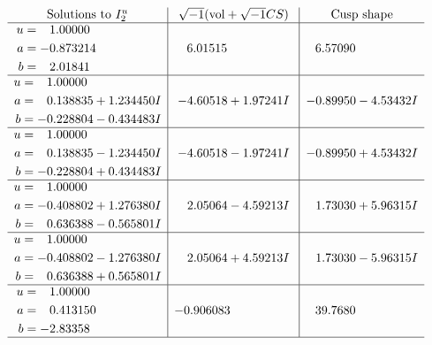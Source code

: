 \documentclass[1p]{elsarticle_modified}
\theoremstyle{definition}
\newcommand{\I}{\sqrt{-1}}
\begin{document}
$$\begin{array}{c|c|c}  
\text{Solutions to }I^u_{2}& \I (\text{vol} + \sqrt{-1}CS) & \text{Cusp shape}\\
 \hline 
\begin{aligned}
u &= \phantom{-}1.00000\phantom{ +0.000000I} \\
a &= -0.873214\phantom{ +0.000000I} \\
b &= \phantom{-}2.01841\phantom{ +0.000000I}\end{aligned}
 & \phantom{-}6.01515\phantom{ +0.000000I} & \phantom{-}6.57090\phantom{ +0.000000I} \\ \hline\begin{aligned}
u &= \phantom{-}1.00000\phantom{ +0.000000I} \\
a &= \phantom{-}0.138835 + 1.234450 I \\
b &= -0.228804 - 0.434483 I\end{aligned}
 & -4.60518 + 1.97241 I & -0.89950 - 4.53432 I \\ \hline\begin{aligned}
u &= \phantom{-}1.00000\phantom{ +0.000000I} \\
a &= \phantom{-}0.138835 - 1.234450 I \\
b &= -0.228804 + 0.434483 I\end{aligned}
 & -4.60518 - 1.97241 I & -0.89950 + 4.53432 I \\ \hline\begin{aligned}
u &= \phantom{-}1.00000\phantom{ +0.000000I} \\
a &= -0.408802 + 1.276380 I \\
b &= \phantom{-}0.636388 - 0.565801 I\end{aligned}
 & \phantom{-}2.05064 - 4.59213 I & \phantom{-}1.73030 + 5.96315 I \\ \hline\begin{aligned}
u &= \phantom{-}1.00000\phantom{ +0.000000I} \\
a &= -0.408802 - 1.276380 I \\
b &= \phantom{-}0.636388 + 0.565801 I\end{aligned}
 & \phantom{-}2.05064 + 4.59213 I & \phantom{-}1.73030 - 5.96315 I \\ \hline\begin{aligned}
u &= \phantom{-}1.00000\phantom{ +0.000000I} \\
a &= \phantom{-}0.413150\phantom{ +0.000000I} \\
b &= -2.83358\phantom{ +0.000000I}\end{aligned}
 & -0.906083\phantom{ +0.000000I} & \phantom{-}39.7680\phantom{ +0.000000I}\\
 \hline 
 \end{array}$$\newpage\newpage\renewcommand{\arraystretch}{1}
\end{document}
